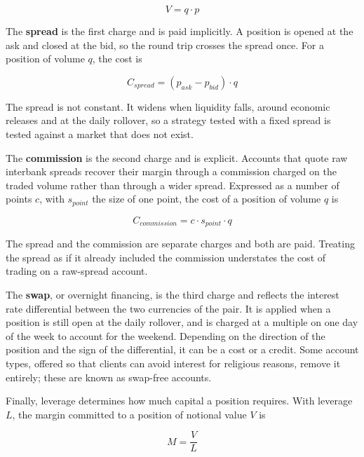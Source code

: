 \begin{equation}
V = q \cdot p
\end{equation}

The \textbf{spread} is the first charge and is paid implicitly. A position is opened at the ask and closed at the bid, so the round trip crosses the spread once. For a position of volume $q$, the cost is

\begin{equation}
C_{spread} = (p_{ask} - p_{bid}) \cdot q
\label{Equation:SpreadCost}
\end{equation}

The spread is not constant. It widens when liquidity falls, around economic releases and at the daily rollover, so a strategy tested with a fixed spread is tested against a market that does not exist.

The \textbf{commission} is the second charge and is explicit. Accounts that quote raw interbank spreads recover their margin through a commission charged on the traded volume rather than through a wider spread. Expressed as a number of points $c$, with $s_{point}$ the size of one point, the cost of a position of volume $q$ is

\begin{equation}
C_{commission} = c \cdot s_{point} \cdot q
\label{Equation:CommissionCost}
\end{equation}

The spread and the commission are separate charges and both are paid. Treating the spread as if it already included the commission understates the cost of trading on a raw-spread account.

The \textbf{swap}, or overnight financing, is the third charge and reflects the interest rate differential between the two currencies of the pair. It is applied when a position is still open at the daily rollover, and is charged at a multiple on one day of the week to account for the weekend. Depending on the direction of the position and the sign of the differential, it can be a cost or a credit. Some account types, offered so that clients can avoid interest for religious reasons, remove it entirely; these are known as swap-free accounts.

Finally, leverage determines how much capital a position requires. With leverage $L$, the margin committed to a position of notional value $V$ is

\begin{equation}
M = \frac{V}{L}
\end{equation}

